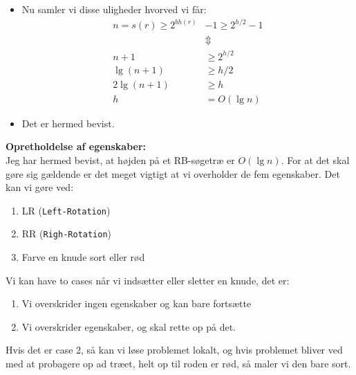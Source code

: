 \begin{itemize}
\begin{itemize}
	\item Nu samler vi disse uligheder hvorved vi får:
	\begin{align*}
	n = s(r) \geq 2^{bh(r)}& - 1 \geq 2^{h/2} - 1\\
	&\Updownarrow \\
	n + 1 &\geq 2^{h/2}\\
	\lg(n+1) &\geq h/2\\
	2\lg(n+1) &\geq h\\
	h &= O(\lg n)
	\end{align*}
	\item Det er hermed bevist.
\end{itemize}

\textbf{Opretholdelse af egenskaber:}\\
Jeg har hermed bevist, at højden på et RB-søgetræ er $O(\lg n)$. For at det skal gøre sig gældende er det meget vigtigt at vi overholder de fem egenskaber. Det kan vi gøre ved:
\begin{enumerate}
	\item LR (\texttt{Left-Rotation})
	\item RR (\texttt{Righ-Rotation})
	\item Farve en knude sort eller rød
\end{enumerate}

Vi kan have to cases når vi indsætter eller sletter en knude, det er:
\begin{enumerate}
	\item Vi overskrider ingen egenskaber og kan bare fortsætte
	\item Vi overskrider egenskaber, og skal rette op på det.
\end{enumerate}

Hvis det er case 2, så kan vi løse problemet lokalt, og hvis problemet bliver ved med at probagere op ad træet, helt op til roden er rød, så maler vi den bare sort.

\end{itemize}

